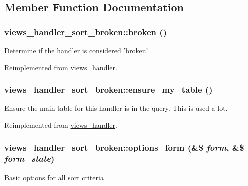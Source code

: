 \subsection{Member Function Documentation}
\hypertarget{classviews__handler__sort__broken_a082f810e9181d6b2f878013897e3cc17}{
\subsubsection[{broken}]{\setlength{\rightskip}{0pt plus 5cm}views\_\-handler\_\-sort\_\-broken::broken ()}}
\label{classviews__handler__sort__broken_a082f810e9181d6b2f878013897e3cc17}
Determine if the handler is considered 'broken' 

Reimplemented from \hyperlink{classviews__handler_ac1cd2ff30cb558c79cc908be516fb725}{views\_\-handler}.\hypertarget{classviews__handler__sort__broken_a148e3b71f7327ed44a139ecefbd1d43b}{
\subsubsection[{ensure\_\-my\_\-table}]{\setlength{\rightskip}{0pt plus 5cm}views\_\-handler\_\-sort\_\-broken::ensure\_\-my\_\-table ()}}
\label{classviews__handler__sort__broken_a148e3b71f7327ed44a139ecefbd1d43b}
Ensure the main table for this handler is in the query. This is used a lot. 

Reimplemented from \hyperlink{classviews__handler_a947f21ef0f21a77f4d103af4702b3600}{views\_\-handler}.\hypertarget{classviews__handler__sort__broken_a57d7f6176962083d4c17cbf448cb792f}{
\subsubsection[{options\_\-form}]{\setlength{\rightskip}{0pt plus 5cm}views\_\-handler\_\-sort\_\-broken::options\_\-form (\&\$ {\em form}, \/  \&\$ {\em form\_\-state})}}
\label{classviews__handler__sort__broken_a57d7f6176962083d4c17cbf448cb792f}
Basic options for all sort criteria 

